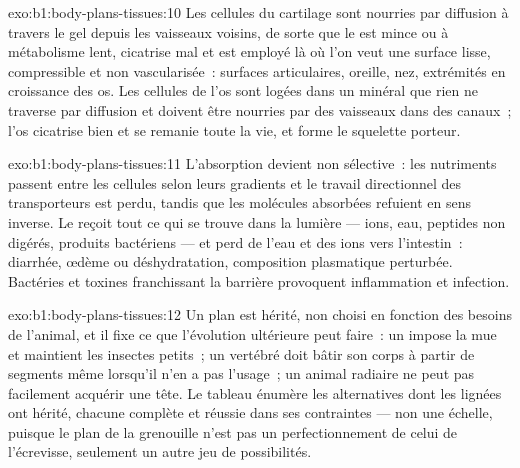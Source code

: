 \begin{solution}{exo:b1:body-plans-tissues:10}
Les cellules du cartilage sont nourries par diffusion à travers le gel
depuis les vaisseaux voisins, de sorte que le  est mince ou à
métabolisme lent, cicatrise mal et est employé là où l'on veut une
surface lisse, compressible et non vascularisée~: surfaces
articulaires, oreille, nez, extrémités en croissance des os. Les
cellules de l'os sont logées dans un minéral que rien ne traverse par
diffusion et doivent être nourries par des vaisseaux dans des canaux~;
l'os cicatrise bien et se remanie toute la vie, et forme le squelette
porteur.
\end{solution}

\begin{solution}{exo:b1:body-plans-tissues:11}
L'absorption devient non sélective~: les nutriments passent entre les
cellules selon leurs gradients et le travail directionnel des
transporteurs est perdu, tandis que les molécules absorbées refuient en
sens inverse. Le  reçoit tout ce qui se trouve dans la
lumière --- ions, eau, peptides non digérés, produits bactériens --- et
perd de l'eau et des ions vers l'intestin~: diarrhée, œdème ou
déshydratation, composition plasmatique perturbée. Bactéries et toxines
franchissant la barrière provoquent inflammation et infection.
\end{solution}

\begin{solution}{exo:b1:body-plans-tissues:12}
Un plan est hérité, non choisi en fonction des besoins de l'animal, et
il fixe ce que l'évolution ultérieure peut faire~: un 
impose la mue et maintient les insectes petits~; un vertébré doit bâtir
son corps à partir de segments même lorsqu'il n'en a pas l'usage~; un
animal radiaire ne peut pas facilement acquérir une tête. Le tableau
énumère les alternatives dont les lignées ont hérité, chacune complète
et réussie dans ses contraintes --- non une échelle, puisque le plan de
la grenouille n'est pas un perfectionnement de celui de l'écrevisse,
seulement un autre jeu de possibilités.
\end{solution}

